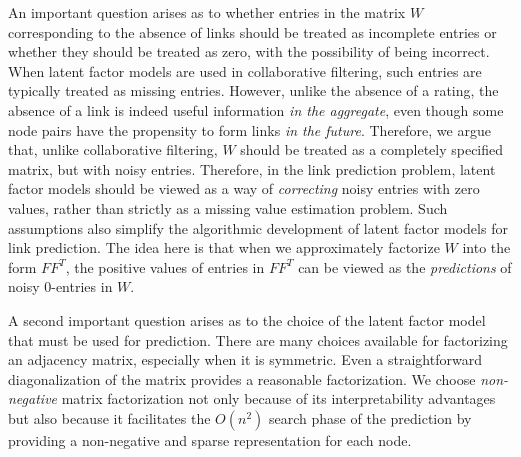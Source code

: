 

An important question arises as to whether entries in the matrix $W$
corresponding to the absence of links should be treated as incomplete
entries or whether they should be treated as zero, with the possibility
of being incorrect. When latent factor models are used in
collaborative filtering, such entries are typically treated as
missing entries. However, unlike the absence of a rating, the
absence of a link is indeed useful information {\em in the
aggregate}, even though some node pairs have the propensity to form
links {\em in the future}. Therefore, we argue that, unlike
collaborative filtering, $W$ should be treated as a completely
specified matrix, but with noisy entries. Therefore, in the link
prediction problem, latent factor models should be viewed as a way
of {\em correcting} noisy entries with zero values, rather than
strictly as a missing value estimation problem.  Such assumptions
also simplify the algorithmic development of latent factor models
for link prediction. The idea here is that when we approximately
factorize $W$ into the form  $F F^T$, the positive values of entries in
$F F^T$ can be viewed as the {\em predictions} of  noisy 0-entries in
$W$.

A second important question arises as to the choice of the latent
factor model that must be used for prediction. There are many
choices available for factorizing an adjacency matrix, especially
when it is symmetric. Even a
straightforward diagonalization of the matrix provides a reasonable
factorization. We  choose {\em non-negative} matrix factorization
not only because of its interpretability advantages but also because
it facilitates the  $O(n^2)$ search phase of the prediction by
providing a non-negative and sparse representation for each node.

